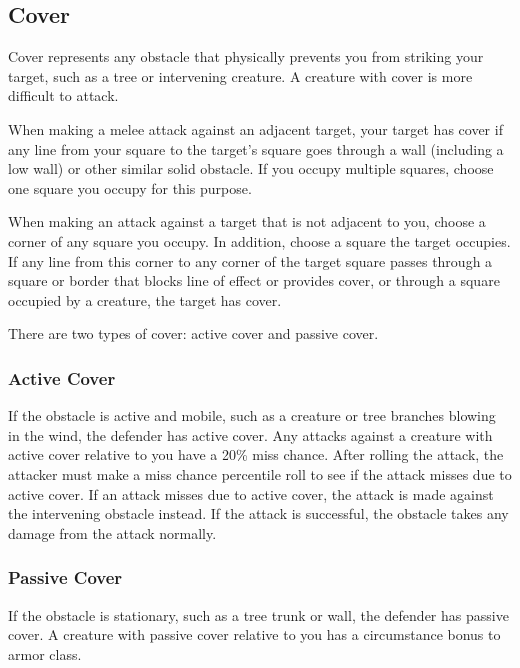 \subsection{Cover}

Cover represents any obstacle that physically prevents you from striking your target, such as a tree or intervening creature. A creature with cover is more difficult to attack.

 When making a melee attack against an adjacent target, your target has cover if any line from your square to the target's square goes through a wall (including a low wall) or other similar solid obstacle. If you occupy multiple squares, choose one square you occupy for this purpose.

When making an attack against a target that is not adjacent to you, choose a corner of any square you occupy. In addition, choose a square the target occupies. If any line from this corner to any corner of the target square passes through a square or border that blocks line of effect or provides cover, or through a square occupied by a creature, the target has cover.

There are two types of cover: active cover and passive cover.

\subsubsection{Active Cover}

If the obstacle is active and mobile, such as a creature or tree branches blowing in the wind, the defender has active cover. Any attacks against a creature with active cover relative to you have a 20\% miss chance. After rolling the attack, the attacker must make a miss chance percentile roll to see if the attack misses due to active cover. If an attack misses due to active cover, the attack is made against the intervening obstacle instead. If the attack is successful, the obstacle takes any damage from the attack normally. 

\subsubsection{Passive Cover}

If the obstacle is stationary, such as a tree trunk or wall, the defender has passive cover. A creature with passive cover relative to you has a  circumstance bonus to armor class.

